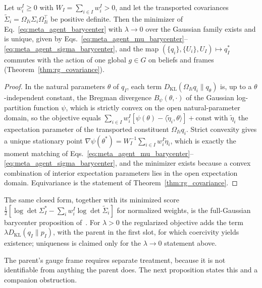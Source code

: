 \begin{proposition}
\label{prop:barycenter_existence}
Let $w_i^I \ge 0$ with $W_I = \sum_{i \in I} w_i^I > 0$, and let the transported covariances $\tilde{\Sigma}_i = \Omega_{Ii}\Sigma_i\Omega_{Ii}^\top$ be positive definite. Then the minimizer of Eq.~\eqref{eq:meta_agent_barycenter} with $\lambda \to 0$ over the Gaussian family exists and is unique, given by Eqs.~\eqref{eq:meta_agent_mu_barycenter}--\eqref{eq:meta_agent_sigma_barycenter}, and the map $(\{q_i\}, \{U_i\}, U_I) \mapsto q_I^*$ commutes with the action of one global $g \in G$ on beliefs and frames (Theorem~\ref{thm:rg_covariance}).
\end{proposition}

\begin{proof}
In the natural parameters $\theta$ of $q_I$, each term $D_{\mathrm{KL}}(\Omega_{Ii}q_i \| q_\theta)$ is, up to a $\theta$-independent constant, the Bregman divergence $B_\psi(\theta, \cdot)$ of the Gaussian log-partition function $\psi$, which is strictly convex on the open natural-parameter domain, so the objective equals $\sum_{i \in I} w_i^I[\psi(\theta) - \langle \tilde{\eta}_i, \theta\rangle] + \mathrm{const}$ with $\tilde{\eta}_i$ the expectation parameter of the transported constituent $\Omega_{Ii}q_i$. Strict convexity gives a unique stationary point $\nabla\psi(\theta^*) = W_I^{-1}\sum_{i \in I} w_i^I \tilde{\eta}_i$, which is exactly the moment matching of Eqs.~\eqref{eq:meta_agent_mu_barycenter}--\eqref{eq:meta_agent_sigma_barycenter}, and the minimizer exists because a convex combination of interior expectation parameters lies in the open expectation domain. Equivariance is the statement of Theorem~\ref{thm:rg_covariance}.
\end{proof}

The same closed form, together with its minimized score $\tfrac12[\log\det\Sigma_I^* - \sum_i w_i^I \log\det\tilde{\Sigma}_i]$ for normalized weights, is the full-Gaussian barycenter proposition of~\cite[Ch.~G8]{DennisGaugeVFESuppG2026}. For $\lambda > 0$ the regularized objective adds the term $\lambda D_{\mathrm{KL}}(q_I \| p_I)$, with the parent in the first slot, for which coercivity yields existence; uniqueness is claimed only for the $\lambda \to 0$ statement above.

The parent's gauge frame requires separate treatment, because it is not identifiable from anything the parent does. The next proposition states this and a companion obstruction.

